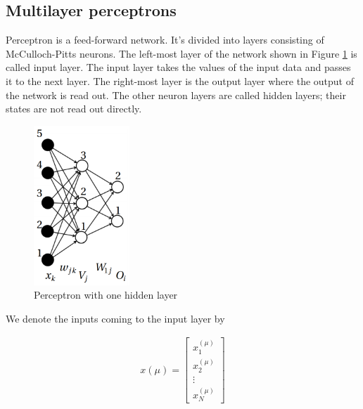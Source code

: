 \newpage

\subsection{Multilayer perceptrons}

Perceptron is a feed-forward network. It's divided into layers consisting of McCulloch-Pitts neurons. The left-most layer of the network shown in Figure \ref{perceptron} is called input layer. The input layer takes the values of the input data and passes it to the next layer. The right-most layer is the output layer where the output of the network is read out. The other neuron layers are called hidden layers; their states are not read out directly. \cite{mehlig}

\vspace{3mm}
\begin{figure}[htb]
	\begin{center}
		\includegraphics*[height=6cm, keepaspectratio]{obr/perceptron.png}
	\end{center}
	\vspace{3mm}
	\caption{Perceptron with one hidden layer \cite{mehlig}} 
	\label{perceptron}
\end{figure}

 \cite{mehlig} We denote the inputs coming to the input layer by \cite{mehlig}

\begin{gather}
	x(\mu)= 
	\begin{bmatrix}
	x_{1}^{(\mu)} \\
	x_{2}^{(\mu)} \\
	\vdots \\
	x_{N}^{(\mu)} 
	\end{bmatrix}
\end{gather}

